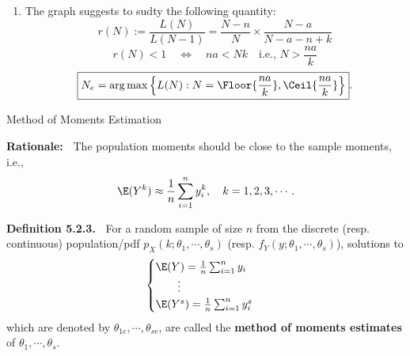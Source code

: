 \begin{frame}
	\begin{enumerate}
		\item[] The graph suggests to sudty the following quantity:
			\vfill
 \[
 r(N) := \frac{L(N)}{L(N-1)} =\frac{N-n}{N} \times \frac{N-a}{N-a-n+k}
 \]
 \vfill \pause
 \[
 r(N)<1 \quad\Longleftrightarrow \quad na<Nk \quad \text{i.e., $N>\frac{na}{k}$}
 \]\pause
 \vfill
 \[
\boxed{ N_e = \mathop{\arg\max} \left\{ L(N): N = \Floor{\frac{na}{k}}, \Ceil{\frac{na}{k}} \right\}}.
 \]
 \myEnd
	\end{enumerate}
\end{frame}
\begin{frame}{Method of Moments Estimation}

 {\bf Rationale:~} The population moments should be close to the sample moments, i.e.,
 \[
\E(Y^k) \approx \frac{1}{n}\sum_{i=1}^ny_i^k , \quad k=1,2,3,\cdots.
 \]

 \vfill
{\bf\noindent Definition 5.2.3.~}  For a random sample of size $n$ from the discrete (resp. continuous) population/pdf $p_X(k;\theta_1,\cdots,\theta_s)$ (resp. $f_Y(y;\theta_1,\cdots,\theta_s)$), solutions to
\[
\begin{cases}
 \E(Y)  = \frac{1}{n}\sum_{i=1}^n y_i \\
 \qquad \vdots\\
 \E(Y^s)  = \frac{1}{n}\sum_{i=1}^n y_i^s \\
\end{cases}
\]
which are denoted by $\theta_{1e},\cdots, \theta_{se}$,
are called the {\bf method of moments estimates} of $\theta_1,\cdots, \theta_s$.
\end{frame}
